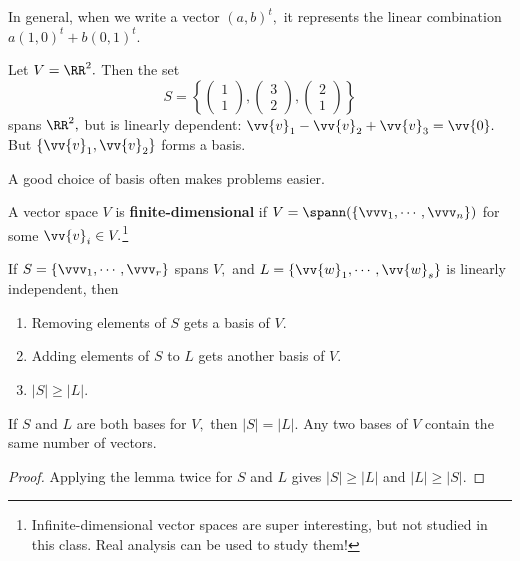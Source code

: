 In general, when we write a vector $(a, b)^t,$ it represents the linear combination $a(1, 0)^t + b(0, 1)^t.$ 

\begin{example}
Let $V = \RR^2.$ Then the set 
\[
S = \left\{
\begin{pmatrix}
1 \\
1
\end{pmatrix}, \begin{pmatrix}
3 \\
2
\end{pmatrix},
\begin{pmatrix}
2 \\
1
\end{pmatrix}\right\}
\]
spans $\RR^2,$ but is linearly dependent: $\vv{v}_1 - \vv{v}_2 + \vv{v}_3 = \vv{0}.$ But $\{\vv{v}_1, \vv{v}_2\}$ forms a basis. 
\end{example}

A good choice of basis often makes problems easier. 

\begin{definition}
A vector space $V$ is \textbf{finite-dimensional} if $V = \spann(\{\vvv_1, \cdots, \vvv_n\})$ for some $\vv{v}_i \in V.$\footnote{Infinite-dimensional vector spaces are super interesting, but not studied in this class. Real analysis can be used to study them!}

\end{definition}

\begin{lemma}
\label{spanlemma}
If $S = \{\vvv_1, \cdots, \vvv_r\}$ spans $V,$ and $L = \{\vv{w}_1, \cdots, \vv{w}_s\}$ is linearly independent, then 
\begin{enumerate}
    \item Removing elements of $S$ gets a basis of $V.$ 
    \item Adding elements of $S$ to $L$ gets another basis of $V.$
    \item $|S| \geq |L|$.
\end{enumerate}
\end{lemma}

\begin{corollary}
If $S$ and $L$ are both bases for $V,$ then $|S| = |L|.$ Any two bases of $V$ contain the same number of vectors.
\end{corollary}

\begin{proof}
Applying the lemma twice for $S$ and $L$ gives $|S| \geq |L|$ and $|L| \geq |S|.$
\end{proof}

